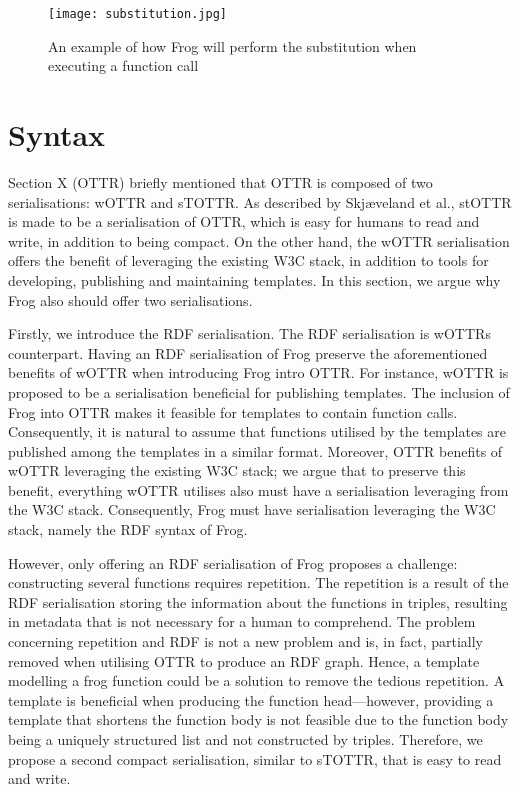 \begin{figure}
    \centering
    \texttt{[image: substitution.jpg]}
    \caption{An example of how Frog will perform the substitution when executing a function call}
    \label{fig:substitution_example}
\end{figure}

\section{Syntax}
Section X (OTTR) briefly mentioned that OTTR is composed of two serialisations: wOTTR and sTOTTR. As described by Skjæveland et al., stOTTR is made to be a serialisation of OTTR, which is easy for humans to read and write, in addition to being compact\autocite[4]{SLKK_OTTR_2021}. On the other hand, the wOTTR serialisation offers the benefit of leveraging the existing W3C stack, in addition to tools for developing, publishing and maintaining templates\autocite[481-482]{SLKF_OTTR_2018}. In this section, we argue why Frog also should offer two serialisations. 

\para
Firstly, we introduce the RDF serialisation. The RDF serialisation is wOTTRs counterpart. Having an RDF serialisation of Frog preserve the aforementioned benefits of wOTTR when introducing Frog intro OTTR. For instance, wOTTR is proposed to be a serialisation beneficial for publishing templates. The inclusion of Frog into OTTR makes it feasible for templates to contain function calls. Consequently, it is natural to assume that functions utilised by the templates are published among the templates in a similar format. Moreover, OTTR benefits of wOTTR leveraging the existing W3C stack; we argue that to preserve this benefit, everything wOTTR utilises also must have a serialisation leveraging from the W3C stack. Consequently, Frog must have serialisation leveraging the W3C stack, namely the RDF syntax of Frog. 

\para 
However, only offering an RDF serialisation of Frog proposes a challenge: constructing several functions requires repetition. The repetition is a result of the RDF serialisation storing the information about the functions in triples, resulting in metadata that is not necessary for a human to comprehend. The problem concerning repetition and RDF is not a new problem and is, in fact, partially removed when utilising OTTR to produce an RDF graph. Hence, a template modelling a frog function could be a solution to remove the tedious repetition. A template is beneficial when producing the function head—however, providing a template that shortens the function body is not feasible due to the function body being a uniquely structured list and not constructed by triples. Therefore, we propose a second compact serialisation, similar to sTOTTR, that is easy to read and write. 

